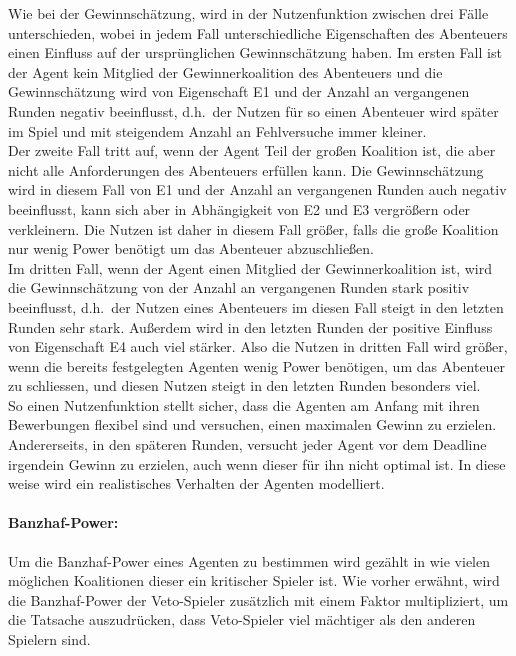 \documentclass[fleqn,10pt]{SelfArx} %
\begin{document}
Wie bei der Gewinnschätzung, wird in der Nutzenfunktion zwischen drei Fälle unterschieden, wobei in jedem Fall unterschiedliche Eigenschaften des Abenteuers einen Einfluss auf der ursprünglichen Gewinnschätzung haben. Im ersten Fall ist der Agent kein Mitglied der Gewinnerkoalition des Abenteuers und die Gewinnschätzung wird von Eigenschaft E1 und der Anzahl an vergangenen Runden negativ beeinflusst, d.h.\ der Nutzen für so einen Abenteuer wird später im Spiel und mit steigendem Anzahl an Fehlversuche immer kleiner. \\
Der zweite Fall tritt auf, wenn der Agent Teil der großen Koalition ist, die aber nicht alle Anforderungen des Abenteuers erfüllen kann. Die Gewinnschätzung wird in diesem Fall von E1 und der Anzahl an vergangenen Runden auch negativ beeinflusst, kann sich aber in Abhängigkeit von E2 und E3 vergrößern oder verkleinern. Die Nutzen ist daher in diesem Fall größer, falls die große Koalition nur wenig Power benötigt um das Abenteuer abzuschließen. \\
Im dritten Fall, wenn der Agent einen Mitglied der Gewinnerkoalition ist, wird die Gewinnschätzung von der Anzahl an vergangenen Runden stark positiv beeinflusst, d.h.\ der Nutzen eines Abenteuers im diesen Fall steigt in den letzten Runden sehr stark. Außerdem wird in den letzten Runden der positive Einfluss von Eigenschaft E4 auch viel stärker. Also die Nutzen in dritten Fall wird größer, wenn die bereits festgelegten Agenten wenig Power benötigen, um das Abenteuer zu schliessen, und diesen Nutzen steigt in den letzten Runden besonders viel.\\
So einen Nutzenfunktion stellt sicher, dass die Agenten am Anfang mit ihren Bewerbungen flexibel sind und versuchen, einen maximalen Gewinn zu erzielen. Andererseits, in den späteren Runden, versucht jeder Agent vor dem Deadline irgendein Gewinn zu erzielen, auch wenn dieser für ihn nicht optimal ist. In diese weise wird ein realistisches Verhalten der Agenten modelliert. 


\paragraph{Banzhaf-Power:}
Um die Banzhaf-Power eines Agenten zu bestimmen wird gezählt in wie vielen möglichen Koalitionen dieser ein kritischer Spieler ist. Wie vorher erwähnt, wird die Banzhaf-Power der Veto-Spieler zusätzlich mit einem Faktor multipliziert, um die Tatsache auszudrücken, dass Veto-Spieler viel mächtiger als den anderen Spielern sind.
\end{document}
